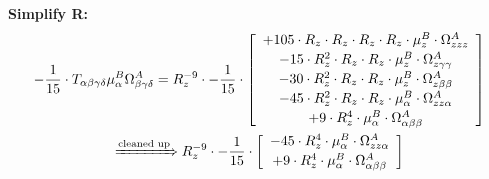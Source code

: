 \documentclass{article}
\begin{document}
\textbf{Simplify R:}
\begin{subequations}\begin{gather}
- \frac{1}{15} \cdot T_{\alpha{}\beta{}\gamma{}\delta{}} \mu{}^{B}_{\alpha{}} \Omega{}^{A}_{\beta{}\gamma{}\delta{}} = R_{z}^{-9} \cdot - \frac{1}{15} \cdot  \left[ \begin{array}{c} 
 		+ 105 \cdot R_{z} \cdot R_{z} \cdot R_{z} \cdot R_{z} \cdot \mu{}^{B}_{z} \cdot \Omega{}^{A}_{zzz} 
 \\[0.2em] 		 - 15 \cdot R_{z}^{2} \cdot R_{z} \cdot R_{z} \cdot \mu{}^{B}_{z} \cdot \Omega{}^{A}_{z\gamma{}\gamma{}} 
 \\[0.2em] 		 - 30 \cdot R_{z}^{2} \cdot R_{z} \cdot R_{z} \cdot \mu{}^{B}_{z} \cdot \Omega{}^{A}_{z\beta{}\beta{}} 
 \\[0.2em] 		 - 45 \cdot R_{z}^{2} \cdot R_{z} \cdot R_{z} \cdot \mu{}^{B}_{\alpha{}} \cdot \Omega{}^{A}_{zz\alpha{}} 
 \\[0.2em] 		 + 9 \cdot R_{z}^{4} \cdot \mu{}^{B}_{\alpha{}} \cdot \Omega{}^{A}_{\alpha{}\beta{}\beta{}}
 \end{array}\right] 
\\ \xRightarrow{\text{cleaned up}}
 R_{z}^{-9} \cdot - \frac{1}{15} \cdot  \left[ \begin{array}{c} 
 		- 45 \cdot R_{z}^{4} \cdot \mu{}^{B}_{\alpha{}} \cdot \Omega{}^{A}_{zz\alpha{}} 
 \\[0.2em] 		 + 9 \cdot R_{z}^{4} \cdot \mu{}^{B}_{\alpha{}} \cdot \Omega{}^{A}_{\alpha{}\beta{}\beta{}}
 \end{array}\right] 
\end{gather}\end{subequations}
\end{document}
